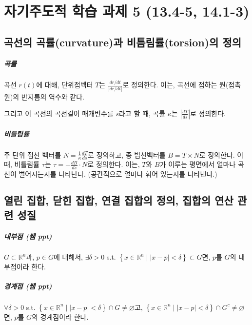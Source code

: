 \chapter{자기주도적 학습 과제 5 (13.4-5, 14.1-3)}
\section{곡선의 곡률(curvature)과 비틈림률(torsion)의 정의}

\paragraph{곡률}
곡선 $r(t)$에 대해, 단위접벡터 $T$는 $\frac{dr / dt }{ \left| dr / dt\right|}$로 정의한다.
이는, 곡선에 접하는 원(접촉원)의 반지름의 역수와 같다.

그리고 이 곡선의 곡선길이 매개변수를 $s$라고 할 때, 곡률 $\kappa$는 $\left| \frac{dT}{ds}\right|$로 정의한다.

\paragraph{비틀림률}
주 단위 접선 벡터를 $N = \frac{1}{\kappa}\frac{dT}{ds}$로 정의하고, 종 법선벡터를 $B = T \times N$로 정의한다. 이때, 비틀림률 $\tau$는 $\tau = -\frac{dB}{ds} \cdot N $로 정의한다.
이는, $T$와 $B$가 이루는 평면에서 얼마나 곡선이 벌어지는지를 나타난다. (공간적으로 얼마나 휘어 있는지를 나타낸다.)

\section{열린 집합, 닫힌 집합, 연결 집합의 정의, 집합의 연산 관련 성질 }
\paragraph{내부점 (쌤 ppt)}
$G \subset \mathbb{R}^n$과, $p \in G$에 대해서, $\exists \delta > 0 $ s.t. $\left\{ x \in \mathbb{R}^n \; | \; \left|x-p\right|<\delta \right\} \subset G$면, $p$를 $G$의 내부점이라 한다.



\paragraph{경계점 (쌤 ppt)}
$\forall \delta > 0 $ s.t. $\left\{ x \in \mathbb{R}^n \; | \; \left|x-p\right|<\delta \right\} \cap G \ne \varnothing$고, $\left\{ x \in \mathbb{R}^n \; | \; \left|x-p\right|<\delta \right\} \cap G^c \ne \varnothing$면, $p$를 $G$의 경계점이라 한다.

